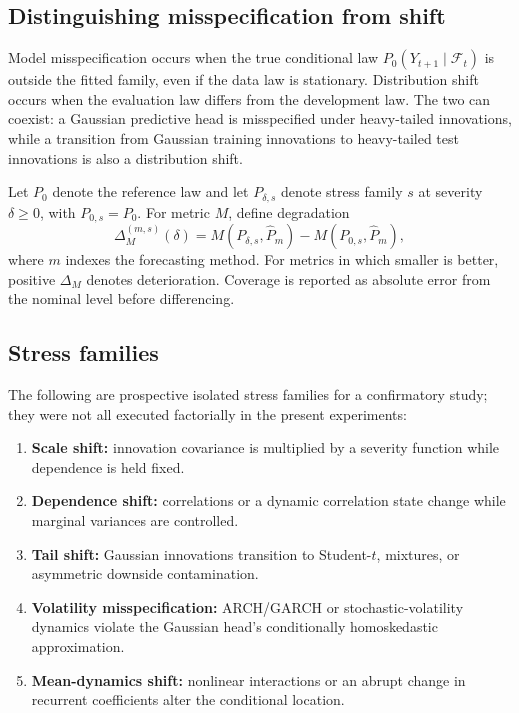 \documentclass[11pt]{article}
\newcommand{\F}{\mathcal{F}}
\begin{document}
\subsection{Distinguishing misspecification from shift}

Model misspecification occurs when the true conditional law $P_0(Y_{t+1}\mid
\F_t)$ is outside the fitted family, even if the data law is stationary.
Distribution shift occurs when the evaluation law differs from the development
law. The two can coexist: a Gaussian predictive head is misspecified under
heavy-tailed innovations, while a transition from Gaussian training innovations
to heavy-tailed test innovations is also a distribution shift.

Let $P_0$ denote the reference law and let $P_{\delta,s}$ denote stress family $s$
at severity $\delta\geq0$, with $P_{0,s}=P_0$. For metric $M$, define degradation
\begin{equation}
\Delta_M^{(m,s)}(\delta)
=M(P_{\delta,s},\widehat P_m)-M(P_{0,s},\widehat P_m),
\label{eq:degradation}
\end{equation}
where $m$ indexes the forecasting method. For metrics in which smaller is better,
positive $\Delta_M$ denotes deterioration. Coverage is reported as absolute error
from the nominal level before differencing.

\subsection{Stress families}

The following are prospective isolated stress families for a confirmatory study;
they were not all executed factorially in the present experiments:
\begin{enumerate}
    \item \textbf{Scale shift:} innovation covariance is multiplied by a severity
    function while dependence is held fixed.
    \item \textbf{Dependence shift:} correlations or a dynamic correlation state
    change while marginal variances are controlled.
    \item \textbf{Tail shift:} Gaussian innovations transition to Student-$t$,
    mixtures, or asymmetric downside contamination.
    \item \textbf{Volatility misspecification:} ARCH/GARCH or stochastic-volatility
    dynamics violate the Gaussian head's conditionally homoskedastic approximation.
    \item \textbf{Mean-dynamics shift:} nonlinear interactions or an abrupt change
    in recurrent coefficients alter the conditional location.
\end{enumerate}
\end{document}
